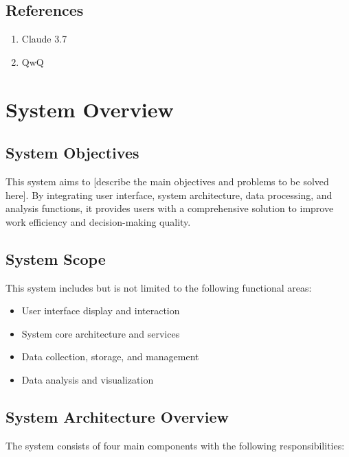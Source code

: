 \documentclass[a4paper,12pt]{article}
\begin{document}
\subsection{References}

\begin{enumerate}
  \item Claude 3.7
  \item QwQ
\end{enumerate}

\section{System Overview}

\subsection{System Objectives}

This system aims to [describe the main objectives and problems to be solved here].
By integrating user interface, system architecture, data processing, and analysis functions, it provides users with a comprehensive solution to improve work efficiency and decision-making quality.

\subsection{System Scope}

This system includes but is not limited to the following functional areas:
\begin{itemize}
  \item User interface display and interaction
  \item System core architecture and services
  \item Data collection, storage, and management
  \item Data analysis and visualization
\end{itemize}

\subsection{System Architecture Overview}

The system consists of four main components with the following responsibilities:
\end{document}
